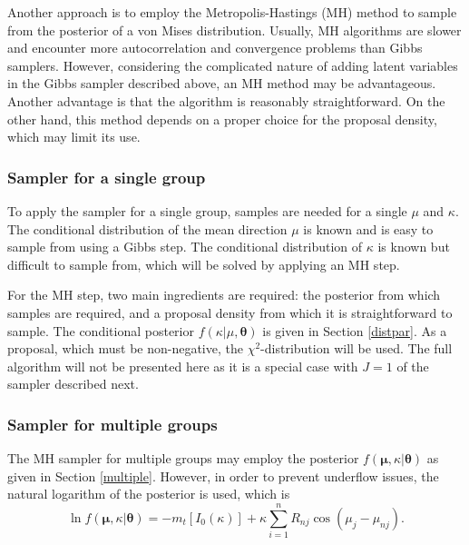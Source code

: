 \documentclass[]{gSCS2e}
\theoremstyle{plain}
\theoremstyle{definition}
\theoremstyle{remark}
\begin{document}
Another approach is to employ the Metropolis-Hastings (MH) method \citep{metropolis1953equation, hastings1970monte} to sample from the posterior of a von Mises distribution. Usually, MH algorithms are slower and encounter more autocorrelation and convergence problems than Gibbs samplers. However, considering the complicated nature of adding latent variables in the Gibbs sampler described above, an MH method may be advantageous. Another advantage is that the algorithm is reasonably straightforward. On the other hand, this method depends on a proper choice for the proposal density, which may limit its use.


\subsubsection{Sampler for a single group}

To apply the sampler for a single group, samples are needed for a single $\mu$ and $\kappa$. The conditional distribution of the mean direction $\mu$ is known and is easy to sample from using a Gibbs step. The conditional distribution of $\kappa$ is known but difficult to sample from, which will be solved by applying an MH step. 

For the MH step, two main ingredients are required: the posterior from which samples are required, and a proposal density from which it is straightforward to sample. The conditional posterior $f(\kappa \vert \mu, \boldsymbol\theta)$ is given in Section \ref{distpar}. As a proposal, which must be non-negative, the $\chi^2$-distribution will be used. The full algorithm will not be presented here as it is a special case with $J=1$ of the sampler described next. 

\subsubsection{Sampler for multiple groups \label{MHmulti}}

The MH sampler for multiple groups may employ the posterior $f(\boldsymbol\mu, \kappa \vert \boldsymbol\theta)$ as given in Section \ref{multiple}. However, in order to prevent underflow issues, the natural logarithm of the posterior is used, which is $$ \ln f(\boldsymbol{\mu}, \kappa \vert \boldsymbol\theta) = - m_t  \left[  I_0(\kappa)\right] +  \kappa \sum_{i=1}^{n} R_{nj} \cos(\mu_{j} - \mu_{nj}). $$ 
\end{document}
